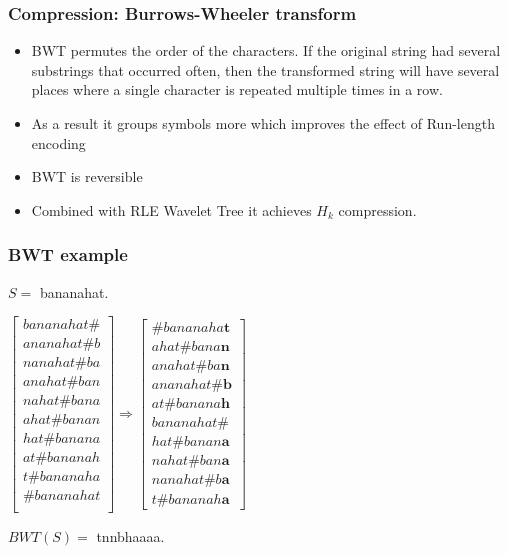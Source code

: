 \documentclass{beamer}
\begin{document}
\begin{frame}
\frametitle{Compression: Burrows-Wheeler transform}
\begin{itemize}
\item BWT permutes the order of the characters. If the original string had several substrings that occurred often, then the transformed string will have several places where a single character is repeated multiple times in a row.
\item As a result it groups symbols more which improves the effect of Run-length encoding
\item BWT is reversible
\item Combined with RLE Wavelet Tree it achieves $H_k$ compression.
\end{itemize}
\end{frame}

\begin{frame}
\frametitle{BWT example}
$S = $ bananahat.
\begin{center}
$\begin{bmatrix}
	bananahat\#\\
	ananahat\#b\\
	nanahat\#ba\\
	anahat\#ban\\
	nahat\#bana\\
	ahat\#banan\\
	hat\#banana\\
	at\#bananah\\
	t\#bananaha\\
	\#bananahat\\
\end{bmatrix} \Rightarrow
\begin{bmatrix}
	\#bananaha\textbf{t}\\
	ahat\#bana\textbf{n}\\
	anahat\#ba\textbf{n}\\
	ananahat\#\textbf{b}\\
	at\#banana\textbf{h}\\
	bananahat\#\\
	hat\#banan\textbf{a}\\
	nahat\#ban\textbf{a}\\
	nanahat\#b\textbf{a}\\
	t\#bananah\textbf{a}
\end{bmatrix}$
\end{center}
$BWT(S) = $ tnnbhaaaa.
\end{frame}
\end{document}
